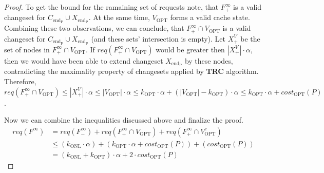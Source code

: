 \begin{proof}
To get the bound for the ramaining set of requests note, that $F^{\infty}_{+}$ is a valid
changeset for $C_{\mathrm{end_P}} \cup X_{\mathrm{end_P}}$. At the same time,
$V_{\mathrm{OPT}}$ forms a valid cache state. Combining these two observations,
we can conclude, that $F^{\infty}_{+} \cap V_{\mathrm{OPT}}$ is a valid
changeset for $C_{\mathrm{end_P}} \cup X_{\mathrm{end_P}}$ (and these sets'
intersection is empty). Let $X^{V}_{+}$ be the set of nodes in $F^{\infty}_{+}
\cap V_{\mathrm{OPT}}$. If $req(F^{\infty}_{+} \cap V_{\mathrm{OPT}})$ would be
greater then $|X^{V}_{+}| \cdot \alpha$, then we would have been able to extend
changeset $X_{\mathrm{end_P}}$ by these nodes, contradicting the maximality
property of changesets applied by \textbf{TRC} algorithm.  Therefore,
$req(F^{\infty}_{+} \cap V_{\mathrm{OPT}}) \leq |X^{V}_{+}| \cdot \alpha \leq
|V_{\mathrm{OPT}}| \cdot \alpha \leq k_{\mathrm{OPT}} \cdot \alpha +
(|V_{\mathrm{OPT}}| - k_{\mathrm{OPT}}) \cdot \alpha \leq k_{\mathrm{OPT}} \cdot \alpha +
cost_{\mathrm{OPT}}(P)$.

Now we can combine the inequalities discussed above and finalize the proof.
\begin{equation*} \begin{split} req(F^{\infty}) & = req(F^{\infty}_{-}) +
req(F^{\infty}_{+} \cap V_{\mathrm{OPT}}) + req(F^{\infty}_{+} \cap
V_{\mathrm{OPT}}^c) \\ & \leq (k_{\mathrm{ONL}} \cdot \alpha) +
(k_{\mathrm{OPT}} \cdot \alpha + cost_{\mathrm{OPT}}(P)) +
(cost_{\mathrm{OPT}}(P)) \\ & = (k_{\mathrm{ONL}} + k_{\mathrm{OPT}}) \cdot
\alpha + 2 \cdot cost_{\mathrm{OPT}}(P) \end{split} \end{equation*} \end{proof}

